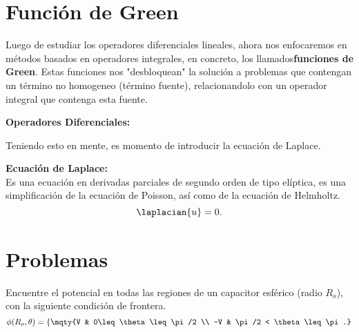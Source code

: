 \section*{Función de Green}
Luego de estudiar los operadores diferenciales lineales, ahora nos enfocaremos en métodos basados en operadores integrales, en concreto, los llamados\textbf{funciones de Green}. Estas funciones nos "desbloquean" la solución a problemas que contengan un término no homogeneo (término fuente), relacionandolo con un operador integral que contenga esta fuente.


\begin{mdframed}[style=warning]
	{\Large \textbf{Operadores Diferenciales:}} \\
	

\end{mdframed}




Teniendo esto en mente, es momento de introducir la ecuación de Laplace.




\begin{mdframed}[style=warning]
	{\Large \textbf{Ecuación de Laplace:}} \\
	Es una ecuación en derivadas parciales de segundo orden de tipo elíptica, es una simplificación de la ecuación de Poisson, así como de la ecuación de Helmholtz.
		$$ \laplacian{u} = 0. $$
\end{mdframed}









\pagebreak


\section*{Problemas}


\begin{ejercicio}
	Encuentre el potencial en todas las regiones de un capacitor esférico (radio $R_o$), con la siguiente condición de frontera.
		$$ \phi (R_o ,\theta) = \left\{ \mqty{V & 0\leq \theta \leq \pi /2 \\ -V & \pi/2 < \theta \leq \pi.} \right. $$
\end{ejercicio}












